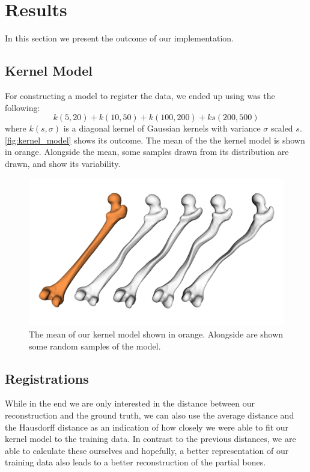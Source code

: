 \section{Results}
\label{sec:results}

In this section we present the outcome of our implementation.


\subsection{Kernel Model}
\label{subsec:kernmodel}

For constructing a model to register the data, we ended up using was the following: 
$$ k(5, 20) + k(10, 50) + k(100, 200) + ks(200, 500) $$
where $k(s, \sigma)$ is a diagonal kernel of Gaussian kernels with variance $\sigma$ scaled $s$. 
\autoref{fig:kernel_model} shows its outcome.
The mean of the the kernel model is shown in orange.
Alongside the mean, some samples drawn from its distribution are drawn, and show its variability.

\begin{figure}
	\centering
  \includegraphics[width=\columnwidth]{./Figures/kernel_model_samples}
  \caption{
    The mean of our kernel model shown in orange. 
    Alongside are shown some random samples of the model.}
  \label{fig:kernel_model}
\end{figure}


\subsection{Registrations}
\label{subsec:registrresults}
While in the end we are only interested in the distance between our reconstruction and the ground truth, we can also use the average distance and the Hausdorff distance as an indication of how closely we were able to fit our kernel model to the training data. 
In contrast to the previous distances, we are able to calculate these ourselves and hopefully, a better representation of our training data also leads to a better reconstruction of the partial bones. 

